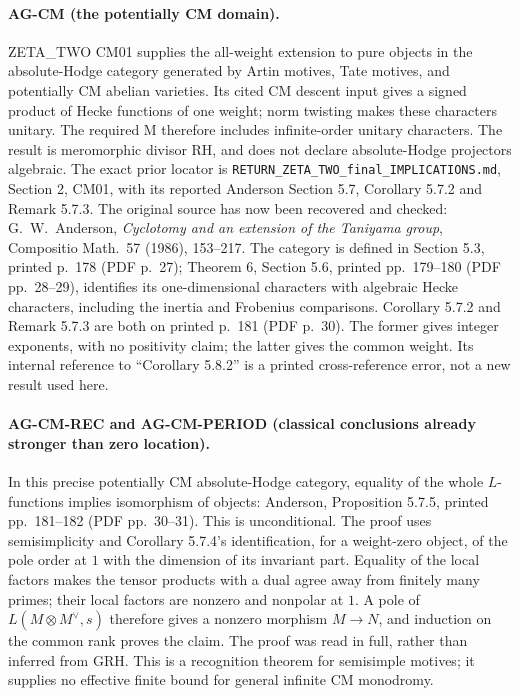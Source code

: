 \paragraph{AG-CM (the potentially CM domain).}
ZETA\_TWO CM01 supplies the all-weight extension to pure objects in the
absolute-Hodge category generated by Artin motives, Tate motives, and
potentially CM abelian varieties. Its cited CM descent input gives a signed
product of Hecke functions of one weight; norm twisting makes these
characters unitary. The required M therefore includes infinite-order
unitary characters. The result is meromorphic divisor RH, and does not
declare absolute-Hodge projectors algebraic. The exact prior locator is
\texttt{RETURN\_ZETA\_TWO\_final\_IMPLICATIONS.md}, Section 2, CM01,
with its reported Anderson Section 5.7, Corollary 5.7.2 and Remark 5.7.3.
The original source has now been recovered and checked: G.~W.~Anderson,
\emph{Cyclotomy and an extension of the Taniyama group}, Compositio
Math.~57 (1986), 153--217. The category is defined in Section 5.3,
printed p.~178 (PDF p.~27); Theorem 6, Section 5.6, printed pp.~179--180
(PDF pp.~28--29), identifies its one-dimensional characters with algebraic
Hecke characters, including the inertia and Frobenius comparisons.
Corollary 5.7.2 and Remark 5.7.3 are both on printed p.~181 (PDF p.~30).
The former gives integer exponents, with no positivity claim; the latter
gives the common weight. Its internal reference to ``Corollary 5.8.2'' is
a printed cross-reference error, not a new result used here.

\paragraph{AG-CM-REC and AG-CM-PERIOD (classical conclusions already
stronger than zero location).}
In this precise potentially CM absolute-Hodge category, equality of the
whole $L$-functions implies isomorphism of objects: Anderson,
Proposition 5.7.5, printed pp.~181--182 (PDF pp.~30--31). This is
unconditional. The proof uses semisimplicity and Corollary 5.7.4's
identification, for a weight-zero object, of the pole order at $1$ with
the dimension of its invariant part. Equality of the local factors makes
the tensor products with a dual agree away from finitely many primes;
their local factors are nonzero and nonpolar at $1$. A pole of
$L(M\otimes M^\vee,s)$ therefore gives a nonzero morphism
$M\longrightarrow N$, and induction on the common rank proves the
claim. The proof was read in full, rather than inferred from GRH.
This is a recognition theorem for semisimple motives; it supplies no
effective finite bound for general infinite CM monodromy.

